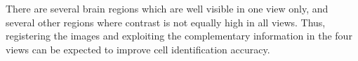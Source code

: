 \documentclass[smallextended]{svjour3}       %
\begin{document}



There are several brain regions which are well visible in one view
only, and several other regions where contrast is not equally high in
all views. Thus, registering the images and exploiting the
complementary information in the four views can be expected to improve
cell identification accuracy.
\end{document}
